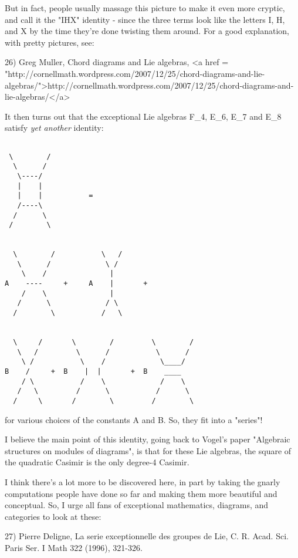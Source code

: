 But in fact, people usually massage this picture to make it even
more cryptic, and call it the "IHX" identity - since the three terms
look like the letters I, H, and X by the time they're done twisting
them around.  For a good explanation, with pretty pictures, see:

26) Greg Muller, Chord diagrams and Lie algebras, 
<a href = "http://cornellmath.wordpress.com/2007/12/25/chord-diagrams-and-lie-algebras/">http://cornellmath.wordpress.com/2007/12/25/chord-diagrams-and-lie-algebras/</a>
 
It then turns out that the exceptional Lie algebras 
F_{4}, E_{6}, E_{7} and E_{8} satisfy 
\emph{yet another} identity:


\begin{verbatim}

 \        /                
  \      /                
   \----/                
   |    |                       
   |    |           = 
   /----\            
  /      \          
 /        \                
                       
 
  \        /           \   /
   \      /             \ /   
    \    /               |   
A    ----     +     A    |       +
    /    \               |  
   /      \             / \  
  /        \           /   \  


  \     /       \        /         \        /
   \   /         \      /           \      /
    \ /           \    /             \____/ 
B    /     +  B    |  |       +  B    ____    
    / \           /    \             /    \
   /   \         /      \           /      \
  /     \       /        \         /        \
\end{verbatim}
    


for various choices of the constants A and B.  So, they fit into a
"series"!

I believe the main point
of this identity, going back to Vogel's paper "Algebraic structures 
on modules of diagrams", is that for these Lie algebras,
the square of the quadratic Casimir is the only degree-4 Casimir.

I think there's a lot more to be discovered here, in part by taking
the gnarly computations people have done so far and making them
more beautiful and conceptual.  
So, I urge all fans of exceptional mathematics, diagrams, and
categories to look at these:

27) Pierre Deligne, La serie exceptionnelle des groupes de Lie, 
C. R. Acad. Sci. Paris Ser. I Math 322 (1996), 321-326.

